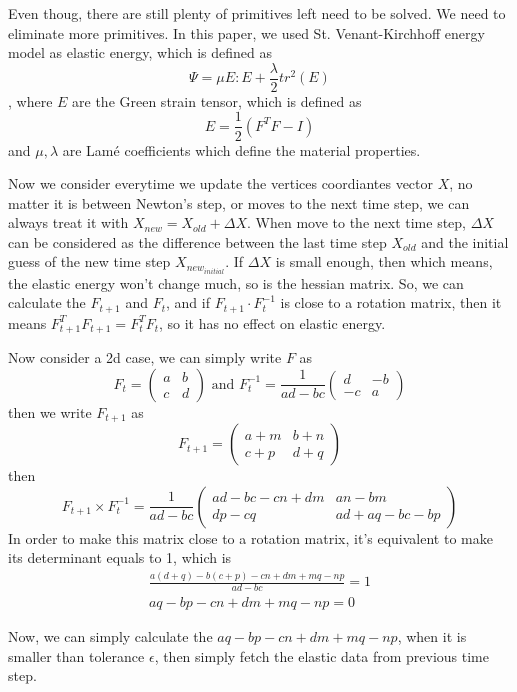 \documentclass[
	11pt, 
	a4paper, 
	oneside,  
	final, 
]{report}
\begin{document}
Even thoug, there are still plenty of primitives left need to be solved. We need to eliminate more primitives. In this paper, we used St. Venant-Kirchhoff energy model as elastic energy, which is defined as 
$$
	\Psi = \mu E:E + \frac{\lambda}{2} tr^{2}(E) 
$$
, where $E$ are the Green strain tensor, which is defined as 
$$
	E = \frac{1}{2}(F^{T}F -I)
$$ and $\mu,\lambda$ are Lamé coefficients which define the material properties.

Now we consider everytime we update the vertices coordiantes vector $X$, no matter it is between Newton's step, or moves to the next time step, we can always treat it with $X_{new} = X_{old} + \Delta X$. When move to the next time step, $\Delta X$ can be considered as the difference between the last time step $X_{old}$ and the initial guess of the new time step $X_{new_{initial}}$. If $ \Delta X$ is small enough, then which means, the elastic energy won't change much, so is the hessian matrix. So, we can calculate the $F_{t+1}$ and $F_{t}$, and if  $F_{t+1} \cdot F_{t}^{-1}$ is close to a rotation matrix, then it means $ F_{t+1}^{T} F_{t+1} = F_{t}^{T} F_{t}$, so it has no effect on elastic energy.


Now consider a 2d case, we can simply write $F$ as
$$
	F_{t} = \begin{pmatrix}
		a & b \\ 
		c & d
	\end{pmatrix}
	\text{ and }
	F_{t}^{-1} = \frac{1}{ad-bc}\begin{pmatrix}
		d  & -b \\ 
		-c & a
	\end{pmatrix}
$$
then we write $F_{t+1}$ as
$$
	F_{t+1} = \begin{pmatrix}
		a+m & b+n \\ 
		c+p & d+q
	\end{pmatrix}
$$
then
$$
	F_{t+1} \times F_{t}^{-1} = \frac{1}{ad-bc}
	\begin{pmatrix}
		ad-bc-cn+dm & an-bm       \\ 
		dp-cq       & ad+aq-bc-bp
	\end{pmatrix}
$$
In order to make this matrix close to a rotation matrix, it's equivalent to make its determinant equals to 1, which is 
\begin{align*}
	\frac{a(d+q)-b(c+p)-cn+dm +mq-np}{ad-bc} = 1 
	\\
	aq-bp-cn+dm+mq-np = 0
\end{align*}

Now, we can simply calculate the $aq-bp-cn+dm+mq-np$, when it is smaller than tolerance $\epsilon$, then simply fetch the elastic data from previous time step.
\end{document}
